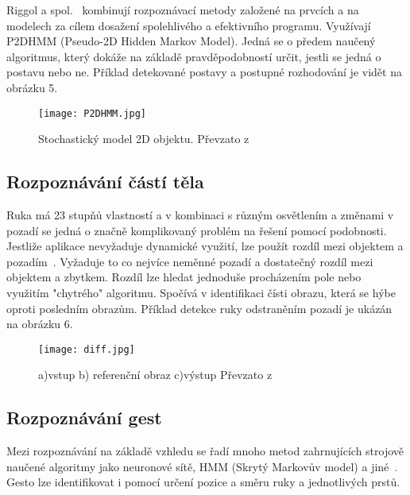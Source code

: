 Riggol a spol.~\cite{11} kombinují rozpoznávací metody založené na prvcích a na modelech za cílem dosažení spolehlivého a efektivního programu. Využívají P2DHMM (Pseudo-2D Hidden Markov Model). Jedná se o předem naučený algoritmus, který dokáže na základě pravděpodobností určit, jestli se jedná o postavu nebo ne. Příklad detekované postavy a postupné rozhodování je vidět na obrázku 5.\\
\begin{figure}[h]
\centering
\texttt{[image: P2DHMM.jpg]}
\caption{Stochastický model 2D objektu. Převzato z ~\cite{11} } %
\end{figure}


\subsection{Rozpoznávání částí těla}
Ruka má 23 stupňů vlastností a v kombinaci s různým osvětlením a změnami v pozadí se jedná o značně komplikovaný problém na řešení pomocí podobnosti.\\

Jestliže aplikace nevyžaduje dynamické využití, lze použít rozdíl mezi objektem a pozadím~\cite{14}. Vyžaduje to co nejvíce neměnné pozadí a dostatečný rozdíl mezi objektem a zbytkem. Rozdíl lze hledat jednoduše procházením pole nebo využitím "chytrého" algoritmu. Spočívá v identifikaci čísti obrazu, která se hýbe oproti posledním obrazům. Příklad detekce ruky odstraněním pozadí je ukázán na obrázku 6.

\begin{figure}[h]
\centering
\texttt{[image: diff.jpg]}
\caption{a)vstup  b) referenční obraz  c)výstup 
Převzato z ~\cite{14} } 
\end{figure}


\subsection{Rozpoznávání gest}
Mezi rozpoznávání na základě vzhledu se řadí mnoho metod zahrnujících strojově naučené algoritmy jako neuronové sítě, HMM (Skrytý Markovův model) a jiné~\cite{3}. Gesto lze identifikovat i pomocí určení pozice a směru ruky a jednotlivých prstů.\\ %

